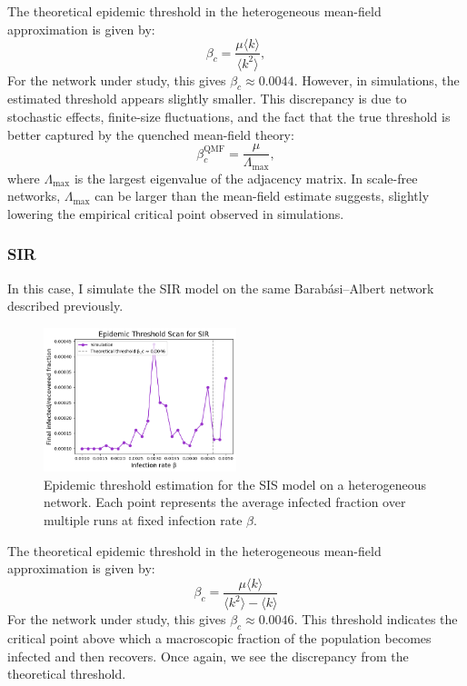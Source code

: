 The theoretical epidemic threshold in the heterogeneous mean-field approximation is given by:
\begin{equation}
\beta_c = \frac{\mu \langle k \rangle}{\langle k^2 \rangle},
\end{equation}
For the network under study, this gives $\beta_c \approx 0.0044$. However, in simulations, the estimated threshold appears slightly smaller. This discrepancy is due to stochastic effects, finite-size fluctuations, and the fact that the true threshold is better captured by the quenched mean-field theory:
\begin{equation}
\beta_c^{\text{QMF}} = \frac{\mu}{\Lambda_{\max}},
\end{equation}
where $\Lambda_{\max}$ is the largest eigenvalue of the adjacency matrix. In scale-free networks, $\Lambda_{\max}$ can be larger than the mean-field estimate suggests, slightly lowering the empirical critical point observed in simulations.



\subsubsection{SIR}

In this case, I simulate the SIR model on the same Barabási–Albert network described previously. 
\begin{figure}[h!]
    \centering
    \includegraphics[width=0.5\textwidth]{images/Heterogeneous/SIR_thresholds.png}
    \caption{Epidemic threshold estimation for the SIS model on a heterogeneous network. Each point represents the average infected fraction over multiple runs at fixed infection rate $\beta$.}
    \label{fig:SIS_threshold_heterogeneous}
\end{figure}
The theoretical epidemic threshold in the heterogeneous mean-field approximation is given by:
\[
\beta_c = \frac{\mu \langle k \rangle}{\langle k^2 \rangle - \langle k \rangle}
\]
For the network under study, this gives $\beta_c \approx 0.0046$. 
This threshold indicates the critical point above which a macroscopic fraction of the population becomes infected and then recovers. Once again, we see the discrepancy from the theoretical threshold.

